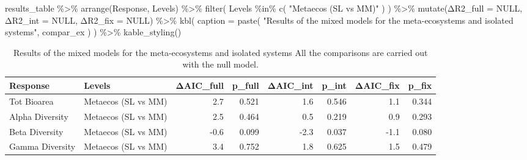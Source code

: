 \documentclass[
]{article}
\newenvironment{Shaded}{\begin{snugshade}}{\end{snugshade}}
\newcommand{\AttributeTok}[1]{\textcolor[rgb]{0.77,0.63,0.00}{#1}}
\newcommand{\ConstantTok}[1]{\textcolor[rgb]{0.00,0.00,0.00}{#1}}
\newcommand{\FunctionTok}[1]{\textcolor[rgb]{0.00,0.00,0.00}{#1}}
\newcommand{\NormalTok}[1]{#1}
\newcommand{\SpecialCharTok}[1]{\textcolor[rgb]{0.00,0.00,0.00}{#1}}
\newcommand{\StringTok}[1]{\textcolor[rgb]{0.31,0.60,0.02}{#1}}
\begin{document}
\begin{Shaded}
\begin{Highlighting}[]
\NormalTok{results\_table }\SpecialCharTok{\%\textgreater{}\%}
  \FunctionTok{arrange}\NormalTok{(Response, Levels) }\SpecialCharTok{\%\textgreater{}\%}
  \FunctionTok{filter}\NormalTok{(}
\NormalTok{    Levels }\SpecialCharTok{\%in\%} \FunctionTok{c}\NormalTok{(}
      \StringTok{"Metaecos (SL vs MM)"}
\NormalTok{    )}
\NormalTok{  ) }\SpecialCharTok{\%\textgreater{}\%}
  \FunctionTok{mutate}\NormalTok{(Δ}\AttributeTok{R2\_full =} \ConstantTok{NULL}\NormalTok{,}
\NormalTok{         Δ}\AttributeTok{R2\_int =} \ConstantTok{NULL}\NormalTok{,}
\NormalTok{         Δ}\AttributeTok{R2\_fix =} \ConstantTok{NULL}\NormalTok{) }\SpecialCharTok{\%\textgreater{}\%}
  \FunctionTok{kbl}\NormalTok{(}
    \AttributeTok{caption =} \FunctionTok{paste}\NormalTok{(}
      \StringTok{"Results of the mixed models for the meta{-}ecosystems and isolated systems"}\NormalTok{,}
\NormalTok{      compar\_ex}
\NormalTok{    )}
\NormalTok{  ) }\SpecialCharTok{\%\textgreater{}\%}
  \FunctionTok{kable\_styling}\NormalTok{()}
\end{Highlighting}
\end{Shaded}

\begin{table}

\caption{\label{tab:fig-connected-systems}Results of the mixed models for the meta-ecosystems and isolated systems All the comparisons are carried out with the null model.}
\centering
\begin{tabular}[t]{l|l|r|r|r|r|r|r}
\hline
Response & Levels & ΔAIC\_full & p\_full & ΔAIC\_int & p\_int & ΔAIC\_fix & p\_fix\\
\hline
Tot Bioarea & Metaecos (SL vs MM) & 2.7 & 0.521 & 1.6 & 0.546 & 1.1 & 0.344\\
\hline
Alpha Diversity & Metaecos (SL vs MM) & 2.5 & 0.464 & 0.5 & 0.219 & 0.9 & 0.293\\
\hline
Beta Diversity & Metaecos (SL vs MM) & -0.6 & 0.099 & -2.3 & 0.037 & -1.1 & 0.080\\
\hline
Gamma Diversity & Metaecos (SL vs MM) & 3.4 & 0.752 & 1.8 & 0.625 & 1.5 & 0.479\\
\hline
\end{tabular}
\end{table}
\end{document}
